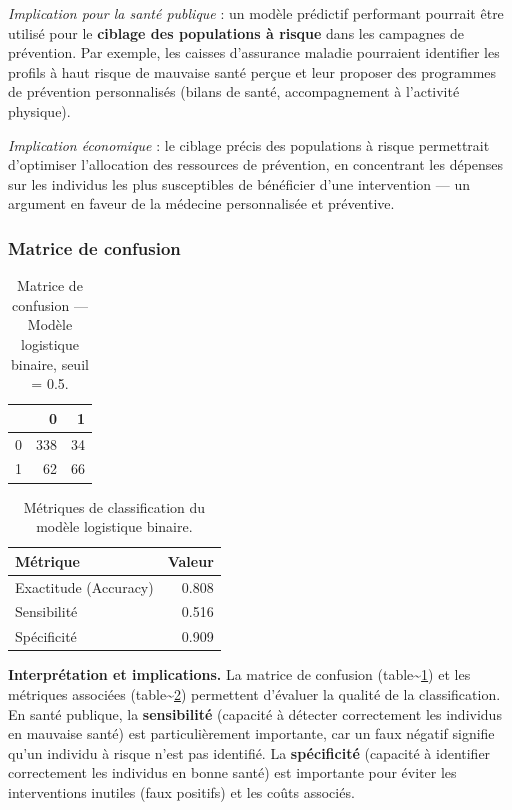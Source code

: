 \documentclass[11pt,a4paper]{memoirerecherche}
\begin{document}
\emph{Implication pour la santé publique} : un modèle prédictif performant pourrait être utilisé pour le \textbf{ciblage des populations à risque} dans les campagnes de prévention. Par exemple, les caisses d'assurance maladie pourraient identifier les profils à haut risque de mauvaise santé perçue et leur proposer des programmes de prévention personnalisés (bilans de santé, accompagnement à l'activité physique).

\emph{Implication économique} : le ciblage précis des populations à risque permettrait d'optimiser l'allocation des ressources de prévention, en concentrant les dépenses sur les individus les plus susceptibles de bénéficier d'une intervention --- un argument en faveur de la médecine personnalisée et préventive.

\hypertarget{matrice-de-confusion}{%
\subsubsection{Matrice de confusion}\label{matrice-de-confusion}}

\begin{table}[!h]
\centering
\caption{\label{tab:tab-confusion}Matrice de confusion --- Modèle logistique binaire, seuil = 0.5.}
\centering
\fontsize{9}{11}\selectfont
\begin{tabular}[t]{lrr}
\toprule
  & 0 & 1\\
\midrule
0 & 338 & 34\\
1 & 62 & 66\\
\bottomrule
\end{tabular}
\end{table}

\begin{table}[!h]
\centering
\caption{\label{tab:tab-metriques}Métriques de classification du modèle logistique binaire.}
\centering
\fontsize{9}{11}\selectfont
\begin{tabular}[t]{lr}
\toprule
Métrique & Valeur\\
\midrule
Exactitude (Accuracy) & 0.808\\
Sensibilité & 0.516\\
Spécificité & 0.909\\
\bottomrule
\end{tabular}
\end{table}

\textbf{Interprétation et implications.} La matrice de confusion (table\textasciitilde\ref{tab:tab-confusion}) et les métriques associées (table\textasciitilde\ref{tab:tab-metriques}) permettent d'évaluer la qualité de la classification. En santé publique, la \textbf{sensibilité} (capacité à détecter correctement les individus en mauvaise santé) est particulièrement importante, car un faux négatif signifie qu'un individu à risque n'est pas identifié. La \textbf{spécificité} (capacité à identifier correctement les individus en bonne santé) est importante pour éviter les interventions inutiles (faux positifs) et les coûts associés.
\end{document}
